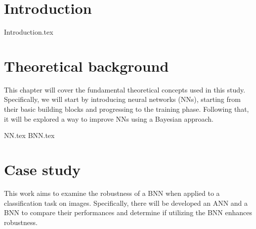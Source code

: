 \documentclass[
	a4paper,
	cleardoublepage=empty,
	headings=twolinechapter,
	numbers=autoenddot,
]{scrbook}
\begin{document}
	\frontmatter
	
	\begin{frontespizio}
		\Margini{3cm}{3cm}{3cm}{3cm}
		\Punteggiatura{}
		\begin{Preambolo*}
			\usepackage[english]{babel}
			\usepackage[T1]{fontenc}
			\usepackage[utf8]{inputenc}
			\usepackage{microtype}
			\usepackage{lmodern}
			\graphicspath{{img/}}
			
			\renewcommand{\frontinstitutionfont}{\fontsize{14}{17}\bfseries\scshape}
			\renewcommand{\fronttitlefont}{\fontsize{17}{21}\bfseries\scshape}
			\renewcommand{\frontfootfont}{\fontsize{12}{14}\bfseries\scshape}
		\end{Preambolo*}
	\end{frontespizio}
	
	\tableofcontents
	\listoffigures
	\mainmatter
	
	\chapter{Introduction}
	{Introduction.tex}
	
	\chapter{Theoretical background}
	This chapter will cover the fundamental theoretical concepts used in this study. Specifically, we will start by introducing neural networks (NNs), starting from their basic building blocks and progressing to the training phase. Following that, it will be explored a way to improve NNs using a Bayesian approach.
	
	{NN.tex}
	{BNN.tex}
		
	\chapter{Case study}
	This work aims to examine the robustness of a BNN when applied to a classification task on images. Specifically, there will be developed an ANN and a BNN to compare their performances and determine if utilizing the BNN enhances robustness.
	
\end{document}
